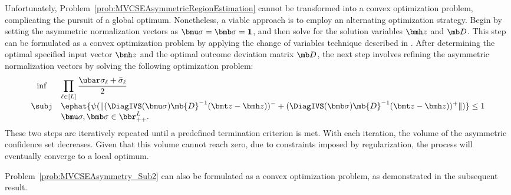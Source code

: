 \documentclass[opre, blindrev]{informs4}
\newcommand{\1}[1]{\mathds{1}{\left(#1\right)}}
\begin{document}
Unfortunately, Problem~\eqref{prob:MVCSEAsymmetricRegionEstimation} cannot be transformed into a convex optimization problem, complicating the pursuit of a global optimum. Nonetheless, a viable approach is to employ an alternating optimization strategy. Begin by setting the asymmetric normalization vectors as $\bmu \sigma=\bmb \sigma=\bm 1$, and then solve for the solution variables $\bmh z$ and $\mb D$. This step can be formulated as a convex optimization problem by applying the change of variables technique described in . After determining the optimal specified input vector $\bmh z$ and the optimal outcome deviation matrix $\mb D$, the next step involves refining the asymmetric normalization vectors by solving the following optimization problem:
\begin{equation}
\label{prob:MVCSEAsymmetry_Sub2}
\begin{array}{cll}
\inf & \displaystyle \prod_{\ell \in [L]} \frac{\ubar \sigma_{\ell} + \bar \sigma_{\ell}}{2} \\
\subj & \displaystyle \ephat{\psi(\|(\DiagIVS(\bmu \sigma) \mb{D}^{-1} (\bmt z - \bmh z))^- + (\DiagIVS(\bmb \sigma) \mb{D}^{-1} (\bmt z - \bmh z ))^+\|)} \leq 1 \\
& \bmu \sigma,\bmb \sigma \in \bbr^L_{++}.  
\end{array} 
\end{equation}
These two steps are iteratively repeated until a predefined termination 
criterion is met. With each iteration, the volume of the asymmetric confidence set decreases. Given that this volume cannot reach zero, due to constraints imposed by regularization, the process will eventually converge to a local optimum.

Problem~\eqref{prob:MVCSEAsymmetry_Sub2} can also be formulated as a convex optimization problem, as demonstrated in the subsequent result.
\end{document}
